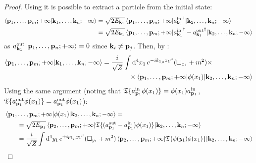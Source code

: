 \begin{proofbox}
  \begin{proof}
    Using  it is possible to extract a particle from the initial state:
    \begin{equation*}
      \begin{split}
        \braket{\mathbf{p}_1,\dots,\mathbf{p}_m;+\infty | \mathbf{k}_1,\dots,\mathbf{k}_n;-\infty}
        & = \sqrt{2E_{\mathbf{k}_1}} \braket{\mathbf{p}_1,\dots,\mathbf{p}_m;+\infty | {a_{\mathbf{k}_1}^\text{in}}^\dagger | \mathbf{k}_2,\dots,\mathbf{k}_n;-\infty} \\
        & = \sqrt{2E_{\mathbf{k}_1}} \braket{\mathbf{p}_1,\dots,\mathbf{p}_m;+\infty | {a_{\mathbf{k}_1}^\text{in}}^\dagger - {a_{\mathbf{k}_1}^\text{out}}^\dagger | \mathbf{k}_2,\dots,\mathbf{k}_n;-\infty}
      \end{split}
    \end{equation*}
    as $ {a_{\mathbf{k}_1}^\text{out}} \ket{\mathbf{p}_1,\dots,\mathbf{p}_n;+\infty} = 0 $ since $ \mathbf{k}_i \neq \mathbf{p}_j $. Then, by :
    \begin{equation*}
      \begin{split}
        \braket{\mathbf{p}_1,\dots,\mathbf{p}_m;+\infty | \mathbf{k}_1,\dots,\mathbf{k}_n;-\infty}
        & = \frac{i}{\sqrt{Z}} \int \mathrm{d}^4x_1\, e^{-i {k_1}_\mu {x_1}^\mu} (\Box_{x_1} + m^2) \times \\
        & \qquad \qquad \times \braket{\mathbf{p}_1,\dots,\mathbf{p}_m;+\infty | \phi(x_1) | \mathbf{k}_2,\dots,\mathbf{k}_n;-\infty}
      \end{split}
    \end{equation*}
    Using the same argument (noting that $ \mathfrak{T}\{a_{\mathbf{p}_1}^\text{in} \phi(x_1)\} = \phi(x_1) a_{\mathbf{p}_1}^\text{in} $, $ \mathfrak{T}\{a_{\mathbf{p}_1}^\text{out} \phi(x_1)\} = a_{\mathbf{p}_1}^\text{out} \phi(x_1) $):
    \begin{equation*}
      \begin{split}
        & \braket{\mathbf{p}_1,\dots,\mathbf{p}_m;+\infty | \phi(x_1) | \mathbf{k}_2,\dots,\mathbf{k}_n;-\infty} = \\
        & \qquad = \sqrt{2E_{\mathbf{p}_1}} \braket{\mathbf{p}_2,\dots,\mathbf{p}_m;+\infty | \mathfrak{T}\{(a_{\mathbf{p}_1}^\text{out} - a_{\mathbf{p}_1}^\text{in}) \phi(x_1)\} | \mathbf{k}_2,\dots,\mathbf{k}_n;-\infty} \\
        & \qquad = \frac{i}{\sqrt{Z}} \int \mathrm{d}^4y_1\, e^{+i {p_1}_\mu {y_1}^\mu} (\Box_{y_1} + m^2) \braket{\mathbf{p}_2,\dots,\mathbf{p}_m;+\infty | \mathfrak{T}\{\phi(y_1) \phi(x_1)\} | \mathbf{k}_2,\dots,\mathbf{k}_n;-\infty}
      \end{split}
    \end{equation*}

\end{proof}
\end{proofbox}
